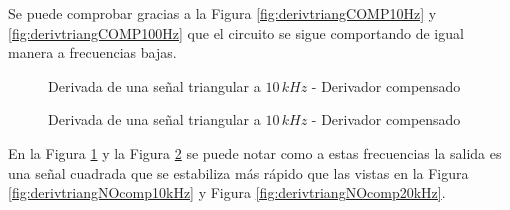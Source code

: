 Se puede comprobar gracias a la Figura \ref{fig:derivtriangCOMP10Hz} y \ref{fig:derivtriangCOMP100Hz} que el circuito se sigue comportando de igual manera a frecuencias bajas.

\begin{figure}[H]
	\begin{center}
		\caption{Derivada de una señal triangular a $10 \,kHz$ - Derivador compensado}
		\label{fig:derivtriangCOMP10kHz}
	\end{center}
\end{figure}

\begin{figure}[H]
	\begin{center}
		\caption{Derivada de una señal triangular a $10 \,kHz$ - Derivador compensado}
		\label{fig:derivtriangCOMP20kHz}
	\end{center}
\end{figure}

En la Figura \ref{fig:derivtriangCOMP10kHz} y la Figura \ref{fig:derivtriangCOMP20kHz} se puede notar como a estas frecuencias la salida es una señal cuadrada que se estabiliza más rápido que las vistas en la Figura \ref{fig:derivtriangNOcomp10kHz} y Figura \ref{fig:derivtriangNOcomp20kHz}.

